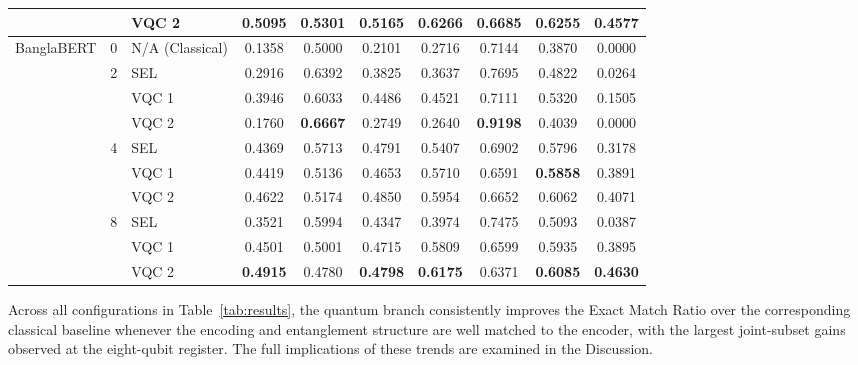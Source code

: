\documentclass[runningheads]{llncs}
\begin{document}
\begin{table}[ht]
{\begin{tabular}{c|c|l|c|c|c|c|c|c|c}
 &  & VQC 2 & \textbf{0.5095} & 0.5301 & \textbf{0.5165} & \textbf{0.6266} & 0.6685 & \textbf{0.6255} & \textbf{0.4577} \\ \midrule
\multirow{10}{*}{BanglaBERT} & 0 & N/A (Classical) & 0.1358 & 0.5000 & 0.2101 & 0.2716 & 0.7144 & 0.3870 & 0.0000 \\ \cline{2-10}
 & \multirow{3}{*}{2} & SEL & 0.2916 & 0.6392 & 0.3825 & 0.3637 & 0.7695 & 0.4822 & 0.0264 \\
 &  & VQC 1 & 0.3946 & 0.6033 & 0.4486 & 0.4521 & 0.7111 & 0.5320 & 0.1505 \\
 &  & VQC 2 & 0.1760 & \textbf{0.6667} & 0.2749 & 0.2640 & \textbf{0.9198} & 0.4039 & 0.0000 \\ \cline{2-10}
 & \multirow{3}{*}{4} & SEL & 0.4369 & 0.5713 & 0.4791 & 0.5407 & 0.6902 & 0.5796 & 0.3178 \\
 &  & VQC 1& 0.4419 & 0.5136 & 0.4653 & 0.5710 & 0.6591 & \textbf{0.5858} & 0.3891 \\
 &  & VQC 2 & 0.4622 & 0.5174 & 0.4850 & 0.5954 & 0.6652 & 0.6062 & 0.4071 \\ \cline{2-10}
 & \multirow{3}{*}{8} & SEL & 0.3521 & 0.5994 & 0.4347 & 0.3974 & 0.7475 & 0.5093 & 0.0387 \\
 &  & VQC 1& 0.4501 & 0.5001 & 0.4715 & 0.5809 & 0.6599 & 0.5935 & 0.3895 \\
 &  & VQC 2 & \textbf{0.4915} & 0.4780 & \textbf{0.4798} & \textbf{0.6175} & 0.6371 & \textbf{0.6085} & \textbf{0.4630} \\ \bottomrule
\end{tabular}%
}
\end{table}

Across all configurations in Table~\ref{tab:results}, the quantum branch consistently improves the Exact Match Ratio over the corresponding classical baseline whenever the encoding and entanglement structure are well matched to the encoder, with the largest joint-subset gains observed at the eight-qubit register. The full implications of these trends are examined in the Discussion.
\end{document}
